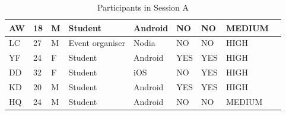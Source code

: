 \begin{table}[H]
{\begin{tabular}{|l|l|l|l|l|l|l|l|l|}
AW       & 18  & M      & Student         & Android                                                         & NO                                                                 & NO                                                                   & MEDIUM                                                       &                                                                    \\ \hline
LC       & 27  & M      & Event organiser & Nodia                                                           & NO                                                                 & NO                                                                   & HIGH                                                         &                                                                    \\ \hline
YF       & 24  & F      & Student         & Android                                                         & YES                                                                & YES                                                                  & HIGH                                                         &                                                                    \\ \hline
DD       & 32  & F      & Student         & iOS                                                             & NO                                                                 & YES                                                                  & HIGH                                                         &                                                                    \\ \hline
KD       & 20  & M      & Student         & Android                                                         & YES                                                                & YES                                                                  & HIGH                                                         &                                                                    \\ \hline
HQ       & 24  & M      & Student         & Android                                                         & NO                                                                 & NO                                                                   & MEDIUM                                                       &                                                                    \\ \hline
\end{tabular}}
\caption{Participants in Session A}
\end{table}

